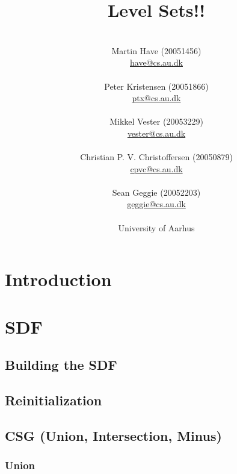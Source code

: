 \documentclass[a4paper, oneside]{memoir}
\title{Level Sets!!}
\author{
 \\
  Martin Have (20051456)\\
  \url{have@cs.au.dk}\\
  \\
  Peter Kristensen (20051866)\\
  \url{ptx@cs.au.dk}\\
  \\
  Mikkel Vester (20053229)\\
  \url{vester@cs.au.dk}\\
  \\
  Christian P. V. Christoffersen (20050879)\\
  \url{cpvc@cs.au.dk}\\
  \\
  Sean Geggie (20052203)\\
  \url{geggie@cs.au.dk}\\
  \\
  University of Aarhus
}
\begin{document}
\maketitle{}



\begin{comment} %
|----------------------------+----------+--------|
| Afsnit                     | Indhold  | Hvem   |
|----------------------------+----------+--------|
| Intro                      | ch. 1,2  | have   |
| - noget om lys/raycasting  |          | ptx    |
| Build SDF / Discretization | artikel? | vester |
| Reinitialize               | ch. 7    | cpvc   |
| Motion                     | ch. 4,6  | ptx    |
| Externally gen. vf.        | ch. 3    | geggie |
| Godunov                    | ch. 5    | cpvc   |
|----------------------------+----------+--------|
\end{comment}

\newpage

\tableofcontents{}
\listoftodos
\chapter{Introduction}
\label{chap:introduction}
  

\chapter{SDF}
\label{chap:sdf}


\section{Building the SDF}
\label{sec:initialization}


\pagebreak
\section{Reinitialization}
\label{sec:reinitialize}


\section{CSG (Union, Intersection, Minus)}
\subsection{Union}
\end{document}
